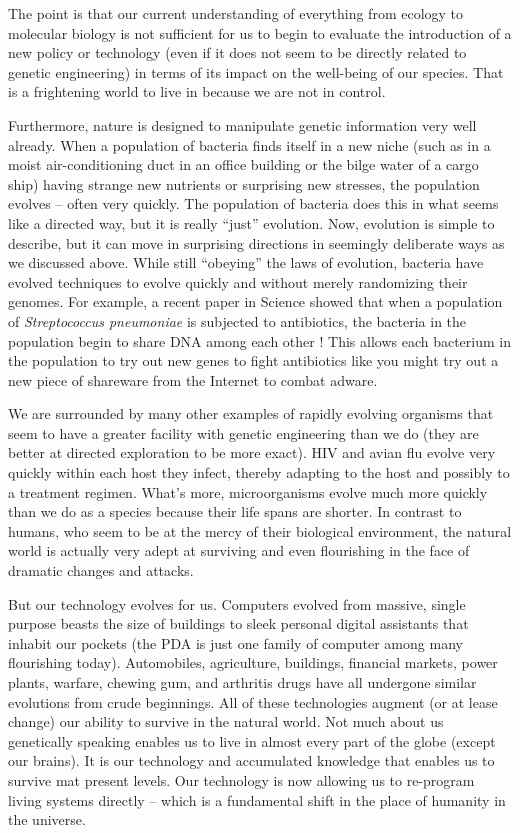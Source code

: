 The point is that our current understanding of everything from ecology
to molecular biology is not sufficient for us to begin to evaluate the
introduction of a new policy or technology (even if it does not seem
to be directly related to genetic engineering) in terms of its impact
on the well-being of our species. That is a frightening world to live
in because we are not in control.

Furthermore, nature is designed to manipulate genetic information very
well already. When a population of bacteria finds itself in a new
niche (such as in a moist air-conditioning duct in an office building
or the bilge water of a cargo ship) having strange new nutrients or
surprising new stresses, the population evolves -- often very
quickly. The population of bacteria does this in what seems like a
directed way, but it is really ``just'' evolution. Now, evolution is
simple to describe, but it can move in surprising directions in
seemingly deliberate ways as we discussed above. While still “obeying”
the laws of evolution, bacteria have evolved techniques to evolve
quickly and without merely randomizing their genomes. For example, a
recent paper in Science showed that when a population of {\em
  Streptococcus pneumoniae} is subjected to antibiotics, the bacteria
in the population begin to share DNA among each other
\cite{strep-evolve}!  This allows each bacterium in the population to
try out new genes to fight antibiotics like you might try out a new
piece of shareware from the Internet to combat adware.

We are surrounded by many other examples of rapidly evolving organisms
that seem to have a greater facility with genetic engineering than we
do (they are better at directed exploration to be more exact). HIV and
avian flu evolve very quickly within each host they infect, thereby
adapting to the host and possibly to a treatment regimen. What’s more,
microorganisms evolve much more quickly than we do as a species
because their life spans are shorter. In contrast to humans, who seem
to be at the mercy of their biological environment, the natural world
is actually very adept at surviving and even flourishing in the face
of dramatic changes and attacks.

But our technology evolves for us. Computers evolved from massive,
single purpose beasts the size of buildings to sleek personal digital
assistants that inhabit our pockets (the PDA is just one family of
computer among many flourishing today). Automobiles, agriculture,
buildings, financial markets, power plants, warfare, chewing gum, and
arthritis drugs have all undergone similar evolutions from crude
beginnings. All of these technologies augment (or at lease change) our
ability to survive in the natural world. Not much about us genetically
speaking enables us to live in almost every part of the globe (except
our brains). It is our technology and accumulated knowledge that
enables us to survive mat present levels. Our technology is now
allowing us to re-program living systems directly -- which is a
fundamental shift in the place of humanity in the universe. 

